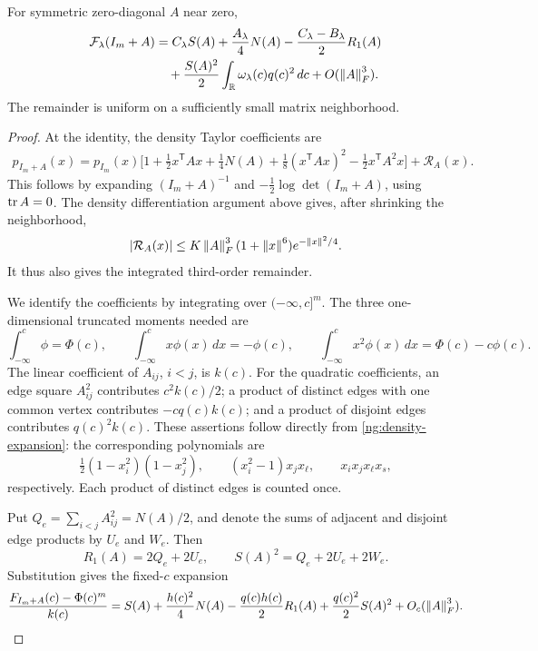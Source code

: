 \begin{lemma}\label{ng:covariance-expansion}
For symmetric zero-diagonal $A$ near zero,
\begin{align}
 \mathcal F_\lambda(I_m+A)
 &=C_\lambda S(A)+\frac{A_\lambda}{4}N(A)
      -\frac{C_\lambda-B_\lambda}{2}R_1(A)\nonumber\\
 &\quad+\frac{S(A)^2}{2}
            \int_{\mathbb R}\omega_\lambda(c)q(c)^2\,dc
       +O(\left\lVert A\right\rVert_F^3).
 \label{ng:full-expansion}
\end{align}
The remainder is uniform on a sufficiently small matrix neighborhood.
\end{lemma}

\begin{proof}
At the identity, the density Taylor coefficients are
\begin{align}
 p_{I_m+A}(x)
 =p_{I_m}(x)\bigl[
  1+\tfrac12x^{\mathsf T}Ax+\tfrac14N(A)
   +\tfrac18(x^{\mathsf T}Ax)^2
   -\tfrac12x^{\mathsf T}A^2x\bigr]+\mathcal R_A(x).
 \label{ng:density-expansion}
\end{align}
This follows by expanding $(I_m+A)^{-1}$ and
$-\tfrac12\log\det(I_m+A)$, using $\operatorname{tr} A=0$.
The density differentiation argument above gives, after shrinking the
neighborhood,
\[
 |\mathcal R_A(x)|
 \le K\left\lVert A\right\rVert_F^3(1+\left\lVert x\right\rVert^6)e^{-\left\lVert x\right\rVert^2/4}.
\]
It thus also gives the integrated third-order remainder.

We identify the coefficients by integrating over $(-\infty,c]^m$.
The three one-dimensional truncated moments needed are
\[
 \int_{-\infty}^c\phi=\Phi(c),\qquad
 \int_{-\infty}^c x\phi(x)\,dx=-\phi(c),\qquad
 \int_{-\infty}^c x^2\phi(x)\,dx=\Phi(c)-c\phi(c).
\]
The linear coefficient of $A_{ij}$, $i<j$, is $k(c)$.
For the quadratic coefficients, an edge square $A_{ij}^2$ contributes
$c^2k(c)/2$; a product of distinct edges with one common vertex contributes
$-c q(c)k(c)$; and a product of disjoint edges contributes $q(c)^2k(c)$.
These assertions follow directly from \eqref{ng:density-expansion}:
the corresponding polynomials are
\[
 \tfrac12(1-x_i^2)(1-x_j^2),\qquad
 (x_i^2-1)x_jx_\ell,\qquad x_ix_jx_\ell x_s,
\]
respectively. Each product of distinct edges is counted once.

Put $Q_e=\sum_{i<j}A_{ij}^2=N(A)/2$, and denote the sums of adjacent
and disjoint edge products by $U_e$ and $W_e$. Then
\[
 R_1(A)=2Q_e+2U_e,\qquad
 S(A)^2=Q_e+2U_e+2W_e.
\]
Substitution gives the fixed-$c$ expansion
\begin{align}
 \frac{F_{I_m+A}(c)-\Phi(c)^m}{k(c)}
 =S(A)+\frac{h(c)^2}{4}N(A)
    -\frac{q(c)h(c)}2R_1(A)
    +\frac{q(c)^2}2S(A)^2+O_c(\left\lVert A\right\rVert_F^3).
 \label{ng:orthant-expansion}
\end{align}


\end{proof}
